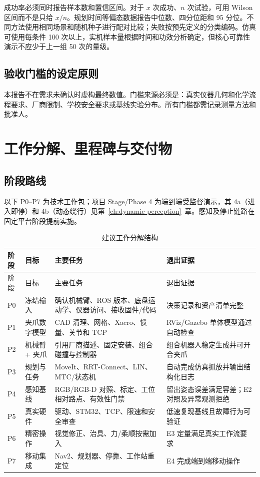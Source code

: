 \documentclass[UTF8,12pt,oneside]{ctexrep}
\begin{document}
成功率必须同时报告样本数和置信区间。对于 $x$ 次成功、$n$ 次试验，可用 Wilson 区间而不是只给 $x/n$。规划时间等偏态数据报告中位数、四分位距和 95 分位。不同方法使用相同场景和随机种子进行配对比较；失败按预先定义的分类编码。仿真可使用每条件 100 次以上，实机样本量根据时间和功效分析确定，但核心可靠性演示不应少于上一组 50 次的量级。

\section{验收门槛的设定原则}

本报告不在需求未确认时虚构最终数值。门槛来源必须是：真实仪器几何和化学流程要求、厂商限制、学校安全要求或基线实验分布。所有门槛都需记录测量方法和批准人。

\chapter{工作分解、里程碑与交付物}

\section{阶段路线}

以下 P0--P7 为技术工作包；项目 Stage/Phase 4 为端到端受监督演示，其 4a（进入即停）和 4b（动态绕行）见第~\ref{ch:dynamic-perception}~章。感知及停止链路在固定平台阶段提前实施。

\begin{longtable}{L{1.15cm}L{3.15cm}L{4.95cm}L{5.35cm}}
\caption{建议工作分解结构}\\
\toprule
阶段 & 目标 & 主要任务 & 退出证据 \\
\midrule
\endfirsthead
\toprule
阶段 & 目标 & 主要任务 & 退出证据 \\
\midrule
\endhead
P0 & 冻结输入 & 确认机械臂、ROS 版本、底盘运动学、仪器访问、接收固件/代码 & 决策记录和资产清单完整 \\
P1 & 夹爪数字模型 & CAD 清理、网格、Xacro、惯量、关节和 TCP & RViz/Gazebo 单体模型通过自动检查 \\
P2 & 机械臂 + 夹爪 & 引用厂商描述、固定安装、组合碰撞与控制器 & 组合机器人稳定生成并可开合夹爪 \\
P3 & 规划与任务 & MoveIt、RRT-Connect、LIN、MTC/状态机 & 自动完成仿真抓放并输出结构化日志 \\
P4 & 感知基线 & RGB/RGB-D 对照、标定、工位相对路点、有效性门禁 & 留出姿态误差满足容差；E2 对照及异常观测拒绝 \\
P5 & 真实硬件 & 驱动、STM32、TCP、限速和安全审查 & 低速复现基线且故障行为可验证 \\
P6 & 精密操作 & 视觉修正、治具、力/柔顺按需加入 & E3 定量满足真实工作流要求 \\
P7 & 移动集成 & Nav2、规划器、停靠、工作站重定位 & E4 完成端到端移动操作 \\
\bottomrule
\end{longtable}
\end{document}
